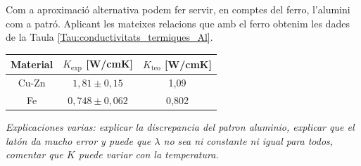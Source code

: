 \documentclass[12pt,twosides,onecolumn,openany]{article}
\newenvironment{Figura}
  {\par\medskip\noindent\minipage{\linewidth}}
  {\endminipage\par\medskip}
\begin{document}
\begin{multicols}{2}
\begin{Figura}
  \label{Tau:conductivitats_termiques_Fe}
\end{Figura}
Com a aproximació alternativa podem fer servir, en comptes del ferro, l'alumini com a patró. Aplicant les mateixes relacions que amb el ferro obtenim les dades de la Taula \ref{Tau:conductivitats_termiques_Al}.
\begin{Figura}
  \centering
  \begin{tabular}{c|c|c}
    Material & $K_{\text{exp}}$ [W/cmK] & $K_{\text{teo}}$ [W/cmK]\\
    \hline\hline
    Cu-Zn & $1,81\pm0,15$ & 1,09\\
    Fe & $0,748\pm0,062$ & 0,802
  \end{tabular}
  \label{Tau:conductivitats_termiques_Al}
\end{Figura}
\textit{Explicaciones varias: explicar la discrepancia del patron aluminio, explicar que el latón da mucho error y puede que $\lambda$ no sea ni constante ni igual para todos, comentar que $K$ puede variar con la temperatura.}

\end{multicols}
\end{document}
